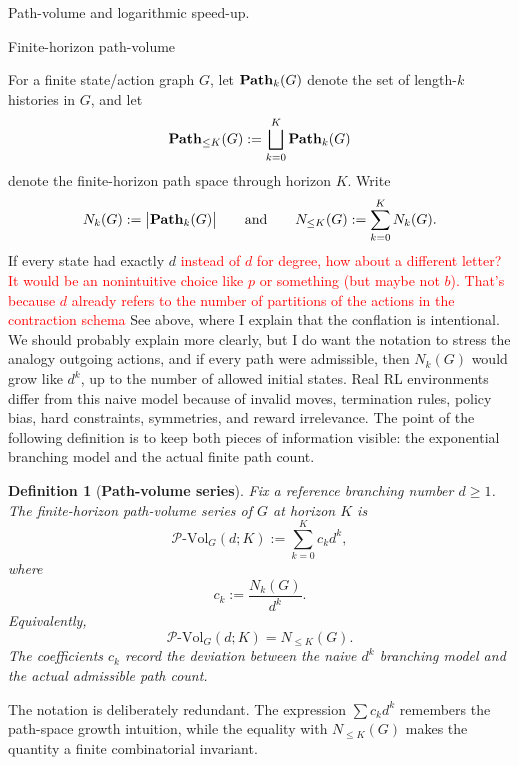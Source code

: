 \documentclass[11pt]{article}
\newtheorem{definition}[subsubsection]{Definition}
\newcommand{\PVol}{\mathcal{P}\text{-}\mathrm{Vol}}
\begin{document}

\begin{section}{Path-volume and logarithmic speed-up.}

\begin{subsection}{Finite-horizon path-volume}

For a finite state/action graph $G$, let
$
\bold{Path}_{k}(G)
$
denote the set of length-$k$ histories in $G$, and let
$$
\bold{Path}_{\le K}(G)
:=
\bigsqcup_{k=0}^{K}\bold{Path}_{k}(G)
$$
denote the finite-horizon path space through horizon $K$.
Write
$$
N_k(G):=\bigl|\bold{Path}_{k}(G)\bigr|
\qquad\text{and}\qquad
N_{\le K}(G):=\sum_{k=0}^{K}N_k(G).
$$
If every state had exactly $d$ \textcolor{red}{instead of $d$ for degree, how about a different letter? It would be an nonintuitive choice like $p$ or something (but maybe not $b$). That's because $d$ already refers to the number of partitions of the actions in the contraction schema} {\color{blue} See above, where I explain that the conflation is intentional. We should probably explain more clearly, but I do want the notation to stress the analogy} outgoing actions, and if every path were admissible, then $N_k(G)$ would grow like $d^k$, up to the number of allowed initial states. Real RL environments differ from this naive model because of invalid moves, termination rules, policy bias, hard constraints, symmetries, and reward irrelevance. The point of the following definition is to keep both pieces of information visible: the exponential branching model and the actual finite path count.

\begin{definition}[{\bf Path-volume series}]\label{def:path-volume-series}
\normalfont
Fix a reference branching number $d\ge 1$. The finite-horizon path-volume series of $G$ at horizon $K$ is
$$
\PVol_G(d;K)
:=
\sum_{k=0}^{K}c_kd^k,
$$
where
$$
c_k:=\frac{N_k(G)}{d^k}.
$$
Equivalently,
$$
\PVol_G(d;K)=N_{\le K}(G).
$$
The coefficients $c_k$ record the deviation between the naive $d^k$ branching model and the actual admissible path count.
\end{definition}

The notation is deliberately redundant. The expression $\sum c_kd^k$ remembers the path-space growth intuition, while the equality with $N_{\le K}(G)$ makes the quantity a finite combinatorial invariant.


\end{subsection}
\end{section}
\end{document}

